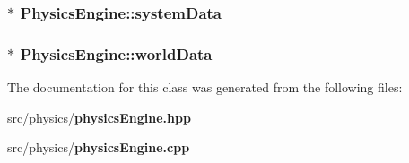 \subsubsection{$\ast$ {\bf Physics\-Engine::system\-Data}\hspace{0.3cm}{\tt  [private]}}\label{classPhysicsEngine_r3}


\subsubsection{$\ast$ {\bf Physics\-Engine::world\-Data}\hspace{0.3cm}{\tt  [private]}}\label{classPhysicsEngine_r2}




The documentation for this class was generated from the following files:\begin{CompactItemize}
\item 
src/physics/{\bf physics\-Engine.hpp}\item 
src/physics/{\bf physics\-Engine.cpp}\end{CompactItemize}
